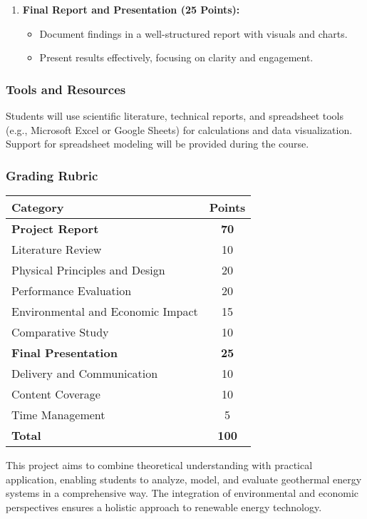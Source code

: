 \documentclass[11pt]{article}
\begin{document}
\begin{enumerate}
    \item \textbf{Final Report and Presentation (25 Points):}
    \begin{itemize}
        \item Document findings in a well-structured report with visuals and charts.
        \item Present results effectively, focusing on clarity and engagement.
    \end{itemize}
\end{enumerate}

\subsubsection*{Tools and Resources}
Students will use scientific literature, technical reports, and spreadsheet tools (e.g., Microsoft Excel or Google Sheets) for calculations and data visualization. Support for spreadsheet modeling will be provided during the course.

\subsubsection*{Grading Rubric}
\begin{center}
\begin{tabular}{|l|c|}
\hline
\textbf{Category} & \textbf{Points} \\
\hline
\textbf{Project Report} & \textbf{70} \\
Literature Review & 10 \\
Physical Principles and Design & 20 \\
Performance Evaluation & 20 \\
Environmental and Economic Impact & 15 \\
Comparative Study & 10 \\
 \hline
        \textbf{Final Presentation} & \textbf{25} \\
        Delivery and Communication & 10 \\
        Content Coverage & 10 \\
        Time Management & 5 \\
        \hline
\hline
\textbf{Total} & \textbf{100} \\
\hline
\end{tabular}
\end{center}

This project aims to combine theoretical understanding with practical application, enabling students to analyze, model, and evaluate geothermal energy systems in a comprehensive way. The integration of environmental and economic perspectives ensures a holistic approach to renewable energy technology.
\newpage
\end{document}
